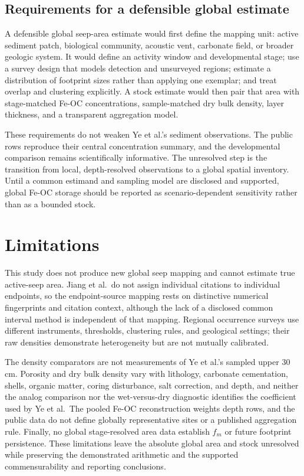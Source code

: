 \documentclass[11pt,letterpaper]{article}
\begin{document}
\subsection{Requirements for a defensible global estimate}

A defensible global seep-area estimate would first define the mapping unit: active sediment patch, biological community, acoustic vent, carbonate field, or broader geologic system. It would define an activity window and developmental stage; use a survey design that models detection and unsurveyed regions; estimate a distribution of footprint sizes rather than applying one exemplar; and treat overlap and clustering explicitly. A stock estimate would then pair that area with stage-matched Fe-OC concentrations, sample-matched dry bulk density, layer thickness, and a transparent aggregation model.

These requirements do not weaken Ye et al.'s sediment observations. The public rows reproduce their central concentration summary, and the developmental comparison remains scientifically informative. The unresolved step is the transition from local, depth-resolved observations to a global spatial inventory. Until a common estimand and sampling model are disclosed and supported, global Fe-OC storage should be reported as scenario-dependent sensitivity rather than as a bounded stock.

\section{Limitations}

This study does not produce new global seep mapping and cannot estimate true active-seep area. Jiang et al.\ do not assign individual citations to individual endpoints, so the endpoint-source mapping rests on distinctive numerical fingerprints and citation context, although the lack of a disclosed common interval method is independent of that mapping. Regional occurrence surveys use different instruments, thresholds, clustering rules, and geological settings; their raw densities demonstrate heterogeneity but are not mutually calibrated.

The density comparators are not measurements of Ye et al.'s sampled upper 30 cm. Porosity and dry bulk density vary with lithology, carbonate cementation, shells, organic matter, coring disturbance, salt correction, and depth, and neither the analog comparison nor the wet-versus-dry diagnostic identifies the coefficient used by Ye et al.\ The pooled Fe-OC reconstruction weights depth rows, and the public data do not define globally representative sites or a published aggregation rule. Finally, no global stage-resolved area data establish $f_m$ or future footprint persistence. These limitations leave the absolute global area and stock unresolved while preserving the demonstrated arithmetic and the supported commensurability and reporting conclusions.
\end{document}
